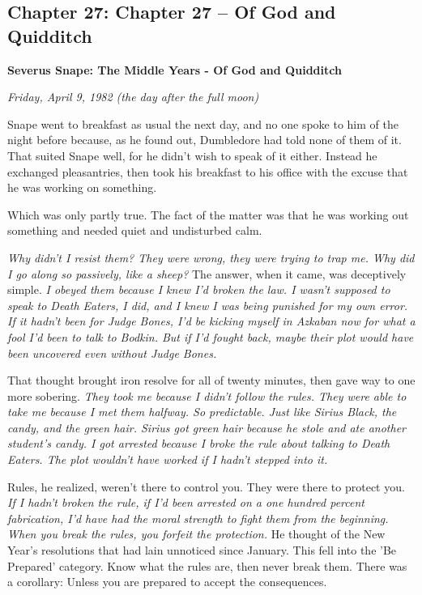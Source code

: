 \documentclass[a4paper,11pt]{article}
\begin{document}
\subsection{Chapter 27: Chapter 27 – Of God and Quidditch}

\textbf{Severus Snape: The Middle Years - Of God and Quidditch}

\emph{Friday, April 9, 1982 (the day after the full moon)}

Snape went to breakfast as usual the next day, and no one spoke to him of the night before because, as he found out, Dumbledore had told none of them of it. That suited Snape well, for he didn't wish to speak of it either. Instead he exchanged pleasantries, then took his breakfast to his office with the excuse that he was working on something.

Which was only partly true. The fact of the matter was that he was working out something and needed quiet and undisturbed calm.

\emph{Why didn't I resist them? They were wrong, they were trying to trap me. Why did I go along so passively, like a sheep?} The answer, when it came, was deceptively simple. \emph{I obeyed them because I knew I'd broken the law. I wasn't supposed to speak to Death Eaters, I did, and I knew I was being punished for my own error. If it hadn't been for Judge Bones, I'd be kicking myself in Azkaban now for what a fool I'd been to talk to Bodkin. But if I'd fought back, maybe their plot would have been uncovered even without Judge Bones.}

That thought brought iron resolve for all of twenty minutes, then gave way to one more sobering. \emph{They took me because I didn't follow the rules. They were able to take me because I met them halfway. So predictable. Just like Sirius Black, the candy, and the green hair. Sirius got green hair because he stole and ate another student's candy. I got arrested because I broke the rule about talking to Death Eaters. The plot wouldn't have worked if I hadn't stepped into it.}

Rules, he realized, weren't there to control you. They were there to protect you. \emph{If I hadn't broken the rule, if I'd been arrested on a one hundred percent fabrication, I'd have had the moral strength to fight them from the beginning. When you break the rules, you forfeit the protection.} He thought of the New Year's resolutions that had lain unnoticed since January. This fell into the 'Be Prepared' category. Know what the rules are, then never break them. There was a corollary: Unless you are prepared to accept the consequences.
\end{document}
